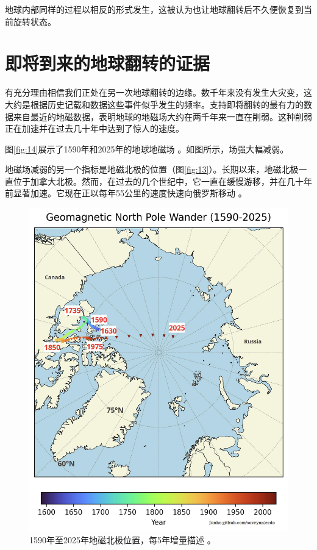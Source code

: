 \documentclass[10pt,twocolumn,letterpaper]{article}
\begin{document}
地球内部同样的过程以相反的形式发生，这被认为也让地球翻转后不久便恢复到当前旋转状态。

\section{即将到来的地球翻转的证据}

有充分理由相信我们正处在另一次地球翻转的边缘。数千年来没有发生大灾变，这大约是根据历史记载和数据这些事件似乎发生的频率。支持即将翻转的最有力的数据来自最近的地磁数据，表明地球的地磁场大约在两千年来一直在削弱。这种削弱正在加速并在过去几十年中达到了惊人的速度。

图\ref{fig:14}展示了1590年和2025年的地球地磁场 \cite{125,126}。如图所示，场强大幅减弱。

地磁场减弱的另一个指标是地磁北极的位置（图\ref{fig:13}）。长期以来，地磁北极一直位于加拿大北极。然而，在过去的几个世纪中，它一直在缓慢游移，并在几十年前显著加速。它现在正以每年55公里的速度快速向俄罗斯移动 \cite{124}。

\begin{figure}[t]
\begin{center}
   \includegraphics[width=1\linewidth]{npw.jpg}
\end{center}
   \caption{1590年至2025年地磁北极位置，每5年增量描述 \cite{142}。}
\label{fig:13}
\label{fig:onecol}
\end{figure}
\end{document}
